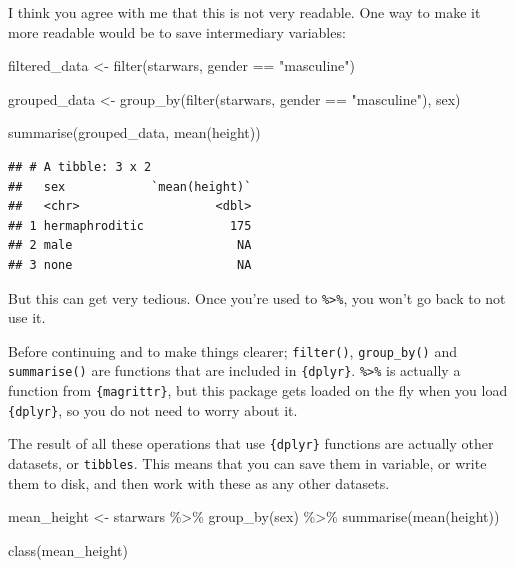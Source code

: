 \documentclass[
]{article}
\newenvironment{Shaded}{\begin{snugshade}}{\end{snugshade}}
\newcommand{\FunctionTok}[1]{\textcolor[rgb]{0.00,0.00,0.00}{#1}}
\newcommand{\NormalTok}[1]{#1}
\newcommand{\OtherTok}[1]{\textcolor[rgb]{0.56,0.35,0.01}{#1}}
\newcommand{\SpecialCharTok}[1]{\textcolor[rgb]{0.00,0.00,0.00}{#1}}
\newcommand{\StringTok}[1]{\textcolor[rgb]{0.31,0.60,0.02}{#1}}
\begin{document}
I think you agree with me that this is not very readable. One way to make it more readable would
be to save intermediary variables:

\begin{Shaded}
\begin{Highlighting}[]
\NormalTok{filtered\_data }\OtherTok{\textless{}{-}} \FunctionTok{filter}\NormalTok{(starwars, gender }\SpecialCharTok{==} \StringTok{"masculine"}\NormalTok{)}

\NormalTok{grouped\_data }\OtherTok{\textless{}{-}} \FunctionTok{group\_by}\NormalTok{(}\FunctionTok{filter}\NormalTok{(starwars, gender }\SpecialCharTok{==} \StringTok{"masculine"}\NormalTok{), sex)}

\FunctionTok{summarise}\NormalTok{(grouped\_data, }\FunctionTok{mean}\NormalTok{(height))}
\end{Highlighting}
\end{Shaded}

\begin{verbatim}
## # A tibble: 3 x 2
##   sex            `mean(height)`
##   <chr>                   <dbl>
## 1 hermaphroditic            175
## 2 male                       NA
## 3 none                       NA
\end{verbatim}

But this can get very tedious. Once you're used to \texttt{\%\textgreater{}\%}, you won't go back to not use it.

Before continuing and to make things clearer; \texttt{filter()}, \texttt{group\_by()} and \texttt{summarise()} are
functions that are included in \texttt{\{dplyr\}}. \texttt{\%\textgreater{}\%} is actually a function from \texttt{\{magrittr\}}, but this
package gets loaded on the fly when you load \texttt{\{dplyr\}}, so you do not need to worry about it.

The result of all these operations that use \texttt{\{dplyr\}} functions are actually other datasets, or
\texttt{tibbles}. This means that you can save them in variable, or write them to disk, and then work with
these as any other datasets.

\begin{Shaded}
\begin{Highlighting}[]
\NormalTok{mean\_height }\OtherTok{\textless{}{-}}\NormalTok{ starwars }\SpecialCharTok{\%\textgreater{}\%}
  \FunctionTok{group\_by}\NormalTok{(sex) }\SpecialCharTok{\%\textgreater{}\%}
  \FunctionTok{summarise}\NormalTok{(}\FunctionTok{mean}\NormalTok{(height))}

\FunctionTok{class}\NormalTok{(mean\_height)}
\end{Highlighting}
\end{Shaded}
\end{document}
